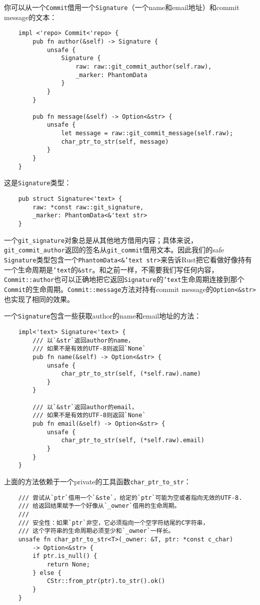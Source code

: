 你可以从一个\texttt{Commit}借用一个\texttt{Signature}（一个name和email地址）和commit message的文本：
\begin{verbatim}
    impl <'repo> Commit<'repo> {
        pub fn author(&self) -> Signature {
            unsafe {
                Signature {
                    raw: raw::git_commit_author(self.raw),
                    _marker: PhantomData
                }
            }
        }

        pub fn message(&self) -> Option<&str> {
            unsafe {
                let message = raw::git_commit_message(self.raw);
                char_ptr_to_str(self, message)
            }
        }
    }
\end{verbatim}

这是\texttt{Signature}类型：
\begin{verbatim}
    pub struct Signature<'text> {
        raw: *const raw::git_signature,
        _marker: PhantomData<&'text str>
    }
\end{verbatim}

一个\texttt{git\_signature}对象总是从其他地方借用内容；具体来说，\texttt{git\_commit\_author}返回的签名从\texttt{git\_commit}借用文本。因此我们的safe \texttt{Signature}类型包含一个\texttt{PhantomData<\&'text str>}来告诉Rust把它看做好像持有一个生命周期是\texttt{'text}的\texttt{\&str}。和之前一样，不需要我们写任何内容，\texttt{Commit::author}也可以正确地把它返回\texttt{Signature}的\texttt{'text}生命周期连接到那个\texttt{Commit}的生命周期。\texttt{Commit::message}方法对持有commit message的\texttt{Option<\&str>}也实现了相同的效果。

一个\texttt{Signature}包含一些获取author的name和email地址的方法：
\begin{verbatim}
    impl<'text> Signature<'text> {
        /// 以`&str`返回author的name，
        /// 如果不是有效的UTF-8则返回`None`
        pub fn name(&self) -> Option<&str> {
            unsafe {
                char_ptr_to_str(self, (*self.raw).name)
            }
        }

        /// 以`&str`返回author的email，
        /// 如果不是有效的UTF-8则返回`None`
        pub fn email(&self) -> Option<&str> {
            unsafe {
                char_ptr_to_str(self, (*self.raw).email)
            }
        }
    }
\end{verbatim}

上面的方法依赖于一个private的工具函数\texttt{char\_ptr\_to\_str}：
\begin{verbatim}
    /// 尝试从`ptr`借用一个`&ste`，给定的`ptr`可能为空或者指向无效的UTF-8.
    /// 给返回结果赋予一个好像从`_owner`借用的生命周期。
    ///
    /// 安全性：如果`ptr`非空，它必须指向一个空字符结尾的C字符串，
    /// 这个字符串的生命周期必须至少和`_owner`一样长。
    unsafe fn char_ptr_to_str<T>(_owner: &T, ptr: *const c_char)
        -> Option<&str> {
        if ptr.is_null() {
            return None;
        } else {
            CStr::from_ptr(ptr).to_str().ok()
        }
    }
\end{verbatim}

